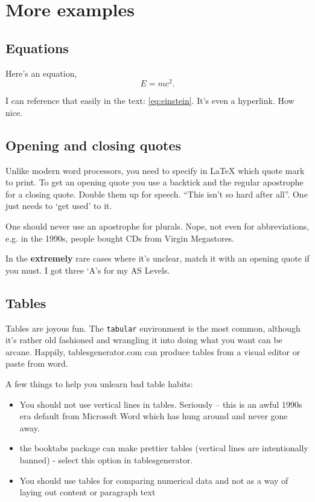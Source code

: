 \chapter{More examples}

\section{Equations}
\label{equations}

Here's an equation,
\begin{equation}
E=mc^2.\label{eq:einstein}
\end{equation}

\noindent I can reference that easily in the text: \autoref{eq:einstein}. It's even a hyperlink. How nice. 

\section{Opening and closing quotes}

Unlike modern word processors, you need to specify in \LaTeX{} which quote mark to print. To get an opening quote you use a backtick and the regular apostrophe for a closing quote. Double them up for speech. ``This isn't so hard after all''. One just needs to `get used' to it. 

One should never use an apostrophe for plurals. Nope, not even for abbreviations, e.g. in the 1990s, people bought CDs from Virgin Megastores. 

In the \textbf{extremely} rare cases where it's unclear, match it with an opening quote if you must. I got three `A's for my AS Levels. 

\section{Tables}
\label{tables}

Tables are joyous fun. The \verb+tabular+ environment is the most common, although it's rather old fashioned and wrangling it into doing what you want can be arcane. Happily, tablesgenerator.com can produce tables from a visual editor or paste from word.

A few things to help you unlearn bad table habits:

\begin{itemize}
    \item You should not use vertical lines in tables. Seriously -- this is an awful 1990s era default from Microsoft Word which has hung around and never gone away. 
    \item the booktabs package can make prettier tables (vertical lines are intentionally banned) - select this option in tablesgenerator.
    \item You should use tables for comparing numerical data and not as a way of laying out content or paragraph text
\end{itemize}

